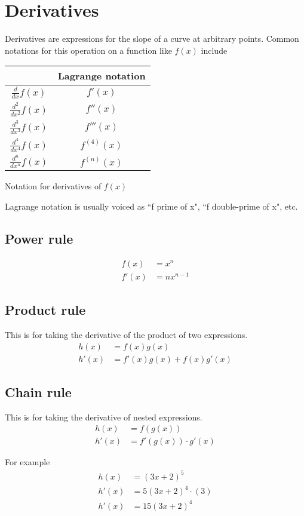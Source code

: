 \section{Derivatives}

Derivatives are expressions for the slope of a curve at arbitrary points. Common
notations for this operation on a function like $f(x)$ include
\begin{booktable}
  \begin{tabular}{|cc|}
    \hline
    \rowcolor{headingbg}
    \multicolumn{1}{|c}{\textbf{Leibniz notation}} &
      \multicolumn{1}{c|}{\textbf{Lagrange notation}} \\
    \hline
    $\frac{d}{dx} f(x)$ & $f'(x)$ \\
    $\frac{d^2}{dx^2} f(x)$ & $f''(x)$ \\
    $\frac{d^3}{dx^3} f(x)$ & $f'''(x)$ \\
    $\frac{d^4}{dx^4} f(x)$ & $f^{(4)}(x)$ \\
    $\frac{d^n}{dx^n} f(x)$ & $f^{(n)}(x)$ \\
    \hline
  \end{tabular}
  \caption{Notation for derivatives of $f(x)$}
\end{booktable}

Lagrange notation is usually voiced as ``f prime of x", ``f double-prime of x",
etc.

\subsection{Power rule}
\begin{align*}
  f(x) &= x^n \\
  f'(x) &= nx^{n - 1}
\end{align*}

\subsection{Product rule}

This is for taking the derivative of the product of two expressions.
\begin{align*}
  h(x) &= f(x)g(x) \\
  h'(x) &= f'(x)g(x) + f(x)g'(x)
\end{align*}

\subsection{Chain rule}

This is for taking the derivative of nested expressions.
\begin{align*}
  h(x) &= f(g(x)) \\
  h'(x) &= f'(g(x)) \cdot g'(x)
\end{align*}

For example
\begin{align*}
  h(x) &= \left(3x + 2\right)^5 \\
  h'(x) &= 5\left(3x + 2\right)^4 \cdot \left(3\right) \\
  h'(x) &= 15\left(3x + 2\right)^4
\end{align*}
